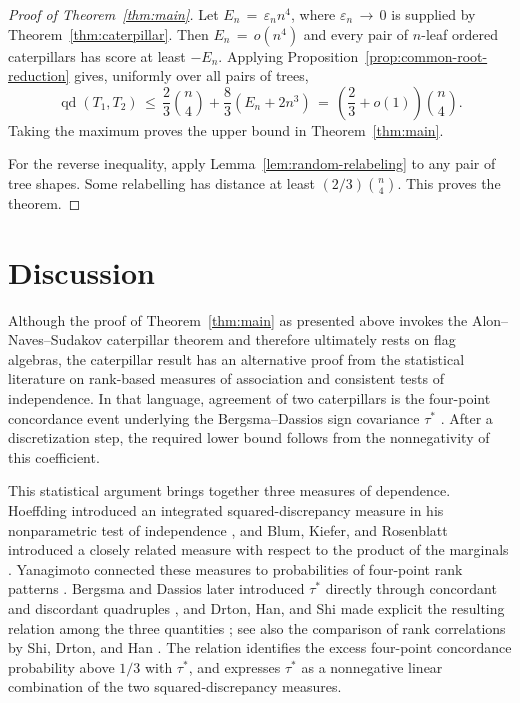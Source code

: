 \documentclass[11pt]{article}
\theoremstyle{definition}
\newcommand{\qd}{\operatorname{qd}}
\begin{document}
\begin{proof}[Proof of Theorem~\ref{thm:main}]
Let $E_n\,=\,\varepsilon_n n^4$, where $\varepsilon_n\,\to\,0$ is supplied by
Theorem~\ref{thm:caterpillar}.  Then $E_n\,=\,o(n^4)$ and every pair of
$n$-leaf ordered caterpillars has score at least $-E_n$.  Applying
Proposition~\ref{prop:common-root-reduction} gives, uniformly over all
pairs of trees,
\[
 \qd(T_1,T_2)
 \,\leq\,\frac23\binom n4+\frac83(E_n+2n^3)
 \,=\,\left(\frac23+o(1)\right)\binom n4.
\]
Taking the maximum proves the upper bound in Theorem~\ref{thm:main}.

For the reverse inequality, apply
Lemma~\ref{lem:random-relabeling} to any pair of tree shapes.  Some
relabelling has distance at least $(2/3)\binom n4$.  This proves the
theorem.
\end{proof}

\section{Discussion}

Although the proof of Theorem~\ref{thm:main} as presented above invokes the
Alon--Naves--Sudakov caterpillar theorem and therefore ultimately rests on
flag algebras, the caterpillar result has an alternative proof from the
statistical literature on rank-based measures of association and consistent
tests of independence.  In that language, agreement of two caterpillars is
the four-point concordance event underlying the Bergsma--Dassios sign
covariance $\tau^*$ \cite{Bergsma_2014}.  After a discretization step, the
required lower bound follows from the nonnegativity of this coefficient.

This statistical argument brings together three measures of dependence.
Hoeffding introduced an integrated squared-discrepancy measure in his
nonparametric test of independence \cite{Hoeffding_1948}, and Blum, Kiefer,
and Rosenblatt introduced a closely related measure with respect to the
product of the marginals \cite{Blum_1961}.  Yanagimoto connected these
measures to probabilities of four-point rank patterns
\cite{Yanagimoto_1970}.  Bergsma and Dassios later introduced $\tau^*$
directly through concordant and discordant quadruples \cite{Bergsma_2014},
and Drton, Han, and Shi made explicit the resulting relation among the three
quantities \cite{Drton_2020}; see also the comparison of rank correlations by
Shi, Drton, and Han \cite{Shi_2022}.  The relation identifies the excess
four-point concordance probability above $1/3$ with $\tau^*$, and expresses
$\tau^*$ as a nonnegative linear combination of the two squared-discrepancy
measures.
\end{document}
